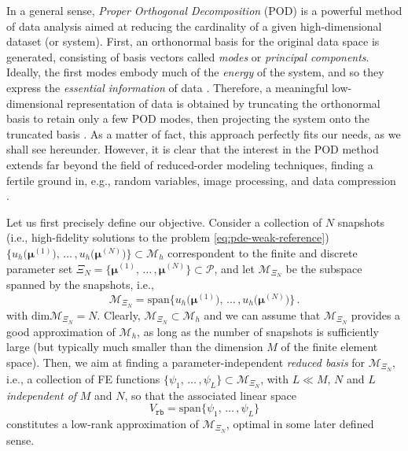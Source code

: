 \documentclass[12pt, a4paper, twoside, openright]{report}
\numberwithin{equation}{chapter}
\theoremstyle{theorem}
\theoremstyle{definition}
\theoremstyle{remark}
\theoremstyle{proposition}
\numberwithin{figure}{chapter}
\newcommand{\bg}[1]{\boldsymbol{#1}}
\begin{document}
		In a general sense, \emph{Proper Orthogonal Decomposition} (POD) is a powerful method of data analysis aimed at reducing the cardinality of a given high-dimensional dataset (or system). First, an orthonormal basis for the original data space is generated, consisting of basis vectors called \emph{modes} or \emph{principal components}. Ideally, the first modes embody much of the \emph{energy} of the system, and so they express the \emph{essential information} of data \cite{QMN15}. Therefore, a meaningful low-dimensional representation of data is obtained by truncating the orthonormal basis to retain only a few POD modes, then projecting the system onto the truncated basis \cite{Vol08}. As a matter of fact, this approach perfectly fits our needs, as we shall see hereunder. However, it is clear that the interest in the POD method extends far beyond the field of reduced-order modeling techniques, finding a fertile ground in, e.g., random variables, image processing, and data compression \cite{Lia02}.
		
		Let us first precisely define our objective. Consider a collection of $N$ snapshots (i.e., high-fidelity solutions to the problem \eqref{eq:pde-weak-reference}) $\big\lbrace u_h \big( \bg{\mu}^{(1)} \big), \, \ldots \, , u_h \big( \bg{\mu}^{(N)} \big) \big\rbrace \subset \mathcal{M}_h$ correspondent to the finite and discrete parameter set $\Xi_N = \big\lbrace \bg{\mu}^{(1)}, \, \ldots \, , \bg{\mu}^{(N)} \big\rbrace \subset \mathcal{P}$, and let $\mathcal{M}_{\Xi_N}$ be the subspace spanned by the snapshots, i.e.,
		\begin{equation*}
			\mathcal{M}_{\Xi_N} = \text{span} \big\lbrace u_h \big( \bg{\mu}^{(1)}), \, \ldots \, , u_h(\bg{\mu}^{(N)} \big) \big\rbrace \, .
		\end{equation*}
		with $\text{dim} \mathcal{M}_{\Xi_N} = N$. Clearly, $\mathcal{M}_{\Xi_N} \subset \mathcal{M}_h$ and we can assume that $\mathcal{M}_{\Xi_N}$ provides a good approximation of $\mathcal{M}_h$, as long as the number of snapshots is sufficiently large (but typically much smaller than the dimension $M$ of the finite element space). Then, we aim at finding a parameter-independent \emph{reduced basis} for $\mathcal{M}_{\Xi_N}$, i.e., a collection of FE functions $\big\lbrace \psi_1, \, \ldots \, , \psi_L \big\rbrace \subset \mathcal{M}_{\Xi_N}$, with $L \ll M, \, N$ and $L$ \emph{independent of} $M$ and $N$, so that the associated linear space 
		\begin{equation*}
			V_{\texttt{rb}} = \text{span} \big\lbrace \psi_1, \, \ldots \, , \psi_L \big\rbrace
		\end{equation*}
		constitutes a low-rank approximation of $\mathcal{M}_{\Xi_N}$, optimal in some later defined sense.
		
\end{document}
